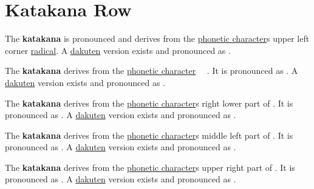 \section{Katakana  Row}\label{sec:KatakanaSaRow}


\label{letter:sa} The  \textbf{katakana}  is
pronounced  and derives from the
\hyperref[sec:PhoneticCharacter]{phonetic character}s  upper
left corner \hyperref[sec:Radical]{radical}.  A \hyperref[sec:Dakuten]{dakuten}
version exists and pronounced as .

\label{letter:shi} The \textbf{katakana} 
derives from the \hyperref[sec:PhoneticCharacter]{phonetic character}　
.  It is pronounced as .  A
\hyperref[sec:Dakuten]{dakuten} version exists and pronounced as .


\label{letter:su} The \textbf{katakana}  derives
from the \hyperref[sec:PhoneticCharacter]{phonetic character}s right lower part
of .  It is pronounced as .  A
\hyperref[sec:Dakuten]{dakuten} version exists and pronounced as .

\label{letter:se} The \textbf{katakana}  derives
from the \hyperref[sec:PhoneticCharacter]{phonetic character}s middle left part
of .  It is pronounced as .  A
\hyperref[sec:Dakuten]{dakuten} version exists and pronounced as .

\newpage

\label{letter:so} The \textbf{katakana}  derives
from the \hyperref[sec:PhoneticCharacter]{phonetic character}s upper right part
of .  It is pronounced as .  A
\hyperref[sec:Dakuten]{dakuten} version exists and pronounced as .



\newpage
\subsection{}\label{sec:KatakanaSa}


